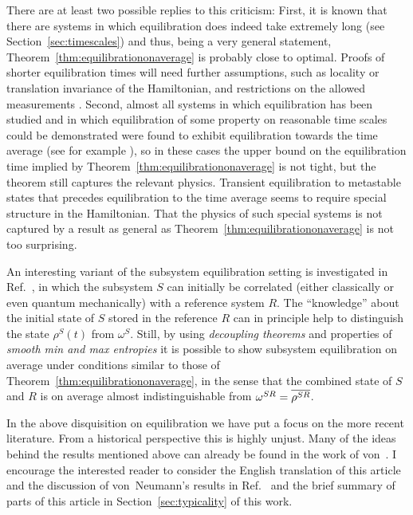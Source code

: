 \documentclass[a4paper,12pt,listof=totoc,index=totoc,bibliography=totoc,headsepline=false,headings=normal,BCOR16.153846mm,DIV12,headinclude,twoside,cleardoublepage=empty,numbers=noenddot,final]{scrreprt}
\theoremstyle{mystyle}
\numberwithin{equation}{section}
\numberwithin{figure}{section}
\numberwithin{lemma}{section}
\numberwithin{theorem}{section}
\numberwithin{corollary}{section}
\numberwithin{definition}{section}
\numberwithin{conjecture}{section}
\numberwithin{observation}{section}
\newcommand{\+}{\mkern2mu}
\newcommand{\taverage}[2][]{
  \ifthenelse{\equal{#1}{}}
  {\overline{#2}}
  {\overline{#2}^{#1}}
}
\DeclareMathOperator{\1}{\mathds{1}}
\begin{document}
There are at least two possible replies to this criticism:
First, it is known that there are systems in which equilibration does indeed take extremely long (see Section~\ref{sec:timescales}) and thus, being a very general statement, Theorem~\ref{thm:equilibrationonaverage} is probably close to optimal.
Proofs of shorter equilibration times will need further assumptions, such as locality or translation invariance of the Hamiltonian, and restrictions on the allowed measurements \cite{1110.5759v1,Linden09}.
Second, almost all systems in which equilibration has been studied and in which equilibration of some property on reasonable time scales could be demonstrated were found to exhibit equilibration towards the time average (see for example \cite{Gemmer09,Campos10,Fagotti2012,Rigol11,1110.4690v1,Rigol07,Rigol2006}), so in these cases the upper bound on the equilibration time implied by Theorem~\ref{thm:equilibrationonaverage} is not tight, but the theorem still captures the relevant physics.
Transient equilibration to metastable states that precedes equilibration to the time average seems to require special structure in the Hamiltonian.
That the physics of such special systems is not captured by a result as general as Theorem~\ref{thm:equilibrationonaverage} is not too surprising. 

An interesting variant of the subsystem equilibration setting is investigated in Ref.~\cite{MasterThesisHutter}, in which the subsystem $S$ can initially be correlated (either classically or even quantum mechanically) with a reference system $R$.
The ``knowledge'' about the initial state of $S$ stored in the reference $R$ can in principle help to distinguish the state $\rho^S(t)$ from $\omega^S$.
Still, by using \emph{decoupling theorems} \cite{Dupuis2010,1109.4348v1,Szehr2012} and properties of \emph{smooth min and max entropies} \cite{Koenig08,Ciganovic2013} it is possible to show subsystem equilibration on average under conditions similar to those of Theorem~\ref{thm:equilibrationonaverage}, in the sense that the combined state of $S$ and $R$ is on average almost indistinguishable from $\omega^{SR} = \taverage{\rho^{SR}}$.

In the above disquisition on equilibration we have put a focus on the more recent literature.
From a historical perspective this is highly unjust.
Many of the ideas behind the results mentioned above can already be found in the work of von~\textcite{vonneumann1929}.
I encourage the interested reader to consider the English translation \cite{Tumulka2010} of this article and the discussion of von~Neumann's results in Ref.~\cite{0907.0108v1} and the brief summary of parts of this article in Section~\ref{sec:typicality} of this work.
\end{document}

